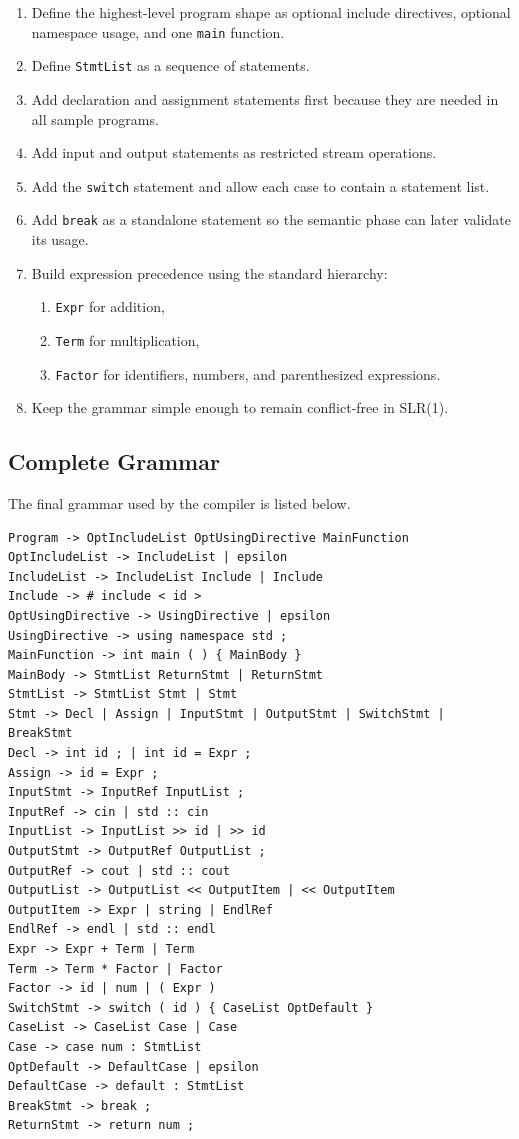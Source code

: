 \documentclass[12pt,a4paper]{article}
\begin{document}
\begin{enumerate}
    \item Define the highest-level program shape as optional include directives, optional namespace usage, and one \texttt{main} function.
    \item Define \texttt{StmtList} as a sequence of statements.
    \item Add declaration and assignment statements first because they are needed in all sample programs.
    \item Add input and output statements as restricted stream operations.
    \item Add the \texttt{switch} statement and allow each case to contain a statement list.
    \item Add \texttt{break} as a standalone statement so the semantic phase can later validate its usage.
    \item Build expression precedence using the standard hierarchy:
    \begin{enumerate}
        \item \texttt{Expr} for addition,
        \item \texttt{Term} for multiplication,
        \item \texttt{Factor} for identifiers, numbers, and parenthesized expressions.
    \end{enumerate}
    \item Keep the grammar simple enough to remain conflict-free in SLR(1).
\end{enumerate}

\subsection{Complete Grammar}
The final grammar used by the compiler is listed below.

\begin{lstlisting}
Program -> OptIncludeList OptUsingDirective MainFunction
OptIncludeList -> IncludeList | epsilon
IncludeList -> IncludeList Include | Include
Include -> # include < id >
OptUsingDirective -> UsingDirective | epsilon
UsingDirective -> using namespace std ;
MainFunction -> int main ( ) { MainBody }
MainBody -> StmtList ReturnStmt | ReturnStmt
StmtList -> StmtList Stmt | Stmt
Stmt -> Decl | Assign | InputStmt | OutputStmt | SwitchStmt | BreakStmt
Decl -> int id ; | int id = Expr ;
Assign -> id = Expr ;
InputStmt -> InputRef InputList ;
InputRef -> cin | std :: cin
InputList -> InputList >> id | >> id
OutputStmt -> OutputRef OutputList ;
OutputRef -> cout | std :: cout
OutputList -> OutputList << OutputItem | << OutputItem
OutputItem -> Expr | string | EndlRef
EndlRef -> endl | std :: endl
Expr -> Expr + Term | Term
Term -> Term * Factor | Factor
Factor -> id | num | ( Expr )
SwitchStmt -> switch ( id ) { CaseList OptDefault }
CaseList -> CaseList Case | Case
Case -> case num : StmtList
OptDefault -> DefaultCase | epsilon
DefaultCase -> default : StmtList
BreakStmt -> break ;
ReturnStmt -> return num ;
\end{lstlisting}
\end{document}
